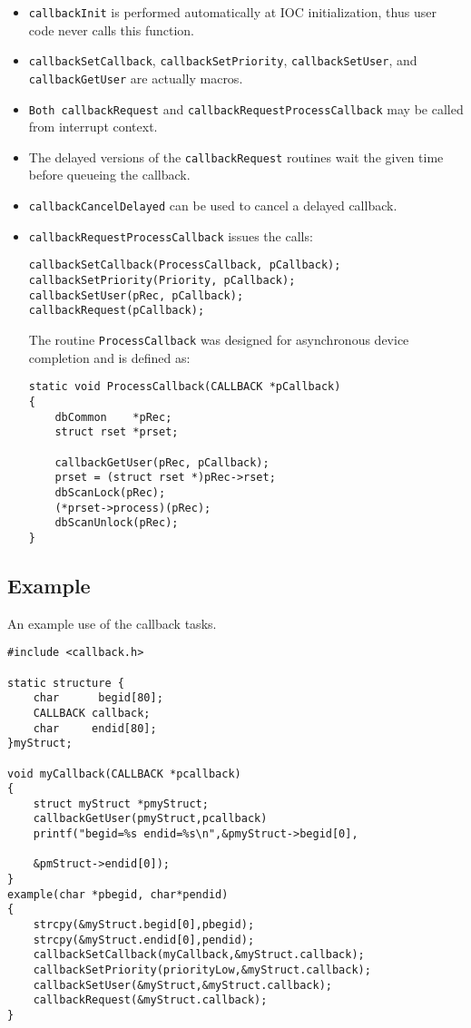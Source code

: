 \begin{itemize}
\item \verb|callbackInit| is performed automatically at IOC initialization, thus user code never calls this function.

\item \verb|callbackSetCallback|, \verb|callbackSetPriority|, \verb|callbackSetUser|, and \verb|callbackGetUser| are 
actually macros.

\item \verb|Both callbackRequest| and \verb|callbackRequestProcessCallback| may be called from interrupt context.

\item The delayed versions of the \verb|callbackRequest| routines wait the given time before queueing the callback.

\item \verb|callbackCancelDelayed| can be used to cancel a delayed callback.

\item \verb|callbackRequestProcessCallback| issues the calls:

\begin{verbatim}
callbackSetCallback(ProcessCallback, pCallback);
callbackSetPriority(Priority, pCallback);
callbackSetUser(pRec, pCallback);
callbackRequest(pCallback);
\end{verbatim}

The routine \verb|ProcessCallback| was designed for asynchronous device completion and is defined as:

\begin{verbatim}
static void ProcessCallback(CALLBACK *pCallback)
{
    dbCommon    *pRec;
    struct rset *prset;
 
    callbackGetUser(pRec, pCallback);
    prset = (struct rset *)pRec->rset;
    dbScanLock(pRec);
    (*prset->process)(pRec);
    dbScanUnlock(pRec);
}
\end{verbatim}

\end{itemize}

\subsection{Example}

An example use of the callback tasks.

\begin{verbatim}
#include <callback.h>

static structure {
    char      begid[80];
    CALLBACK callback;
    char     endid[80];
}myStruct;

void myCallback(CALLBACK *pcallback)
{
    struct myStruct *pmyStruct;
    callbackGetUser(pmyStruct,pcallback)
    printf("begid=%s endid=%s\n",&pmyStruct->begid[0],

    &pmStruct->endid[0]);
}
example(char *pbegid, char*pendid)
{
    strcpy(&myStruct.begid[0],pbegid);
    strcpy(&myStruct.endid[0],pendid);
    callbackSetCallback(myCallback,&myStruct.callback);
    callbackSetPriority(priorityLow,&myStruct.callback);
    callbackSetUser(&myStruct,&myStruct.callback);
    callbackRequest(&myStruct.callback);
}
\end{verbatim}


